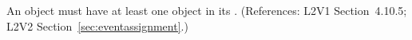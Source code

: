 An \Event object must have at least one \EventAssignment object in its
.  (References: L2V1 Section~4.10.5; L2V2
Section~\ref{sec:eventassignment}.)
